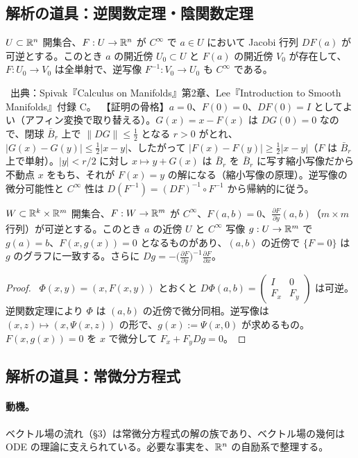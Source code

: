 \subsection{解析の道具：逆関数定理・陰関数定理}
\begin{thm}[逆関数定理]\label{A:thm:invfun}
$U\subset\mathbb R^n$ 開集合、$F:U\to\mathbb R^n$ が $C^\infty$ で $a\in U$ において Jacobi 行列 $DF(a)$ が可逆とする。このとき $a$ の開近傍 $U_0\subset U$ と $F(a)$ の開近傍 $V_0$ が存在して、$F:U_0\to V_0$ は全単射で、逆写像 $F^{-1}:V_0\to U_0$ も $C^\infty$ である。
\end{thm}
\tC\ 出典：Spivak『Calculus on Manifolds』第2章、Lee『Introduction to Smooth Manifolds』付録 C。\ 【証明の骨格】$a=0$、$F(0)=0$、$DF(0)=I$ としてよい（アフィン変換で取り替える）。$G(x)=x-F(x)$ は $DG(0)=0$ なので、閉球 $\bar B_r$ 上で $\|DG\|\le\frac12$ となる $r>0$ がとれ、$|G(x)-G(y)|\le\frac12|x-y|$、したがって $|F(x)-F(y)|\ge\frac12|x-y|$（$F$ は $\bar B_r$ 上で単射）。$|y|<r/2$ に対し $x\mapsto y+G(x)$ は $\bar B_r$ を $\bar B_r$ に写す縮小写像だから不動点 $x$ をもち、それが $F(x)=y$ の解になる（縮小写像の原理）。逆写像の微分可能性と $C^\infty$ 性は $D(F^{-1})=(DF)^{-1}\circ F^{-1}$ から帰納的に従う。

\begin{thm}[陰関数定理]\label{A:thm:implicit}
$W\subset\mathbb R^k\times\mathbb R^m$ 開集合、$F:W\to\mathbb R^m$ が $C^\infty$、$F(a,b)=0$、$\frac{\partial F}{\partial y}(a,b)$（$m\times m$ 行列）が可逆とする。このとき $a$ の近傍 $U$ と $C^\infty$ 写像 $g:U\to\mathbb R^m$ で $g(a)=b$、$F(x,g(x))=0$ となるものがあり、$(a,b)$ の近傍で $\{F=0\}$ は $g$ のグラフに一致する。さらに $Dg=-\bigl(\frac{\partial F}{\partial y}\bigr)^{-1}\frac{\partial F}{\partial x}$。
\end{thm}
\begin{proof}
\tP\ $\Phi(x,y)=(x,F(x,y))$ とおくと $D\Phi(a,b)=\begin{pmatrix}I&0\\F_x&F_y\end{pmatrix}$ は可逆。逆関数定理により $\Phi$ は $(a,b)$ の近傍で微分同相。逆写像は $(x,z)\mapsto(x,\Psi(x,z))$ の形で、$g(x):=\Psi(x,0)$ が求めるもの。$F(x,g(x))=0$ を $x$ で微分して $F_x+F_yDg=0$。
\end{proof}

\subsection{解析の道具：常微分方程式}
\paragraph{動機。}ベクトル場の流れ（§3）は常微分方程式の解の族であり、ベクトル場の幾何は ODE の理論に支えられている。必要な事実を、$\mathbb R^n$ の自励系で整理する。

